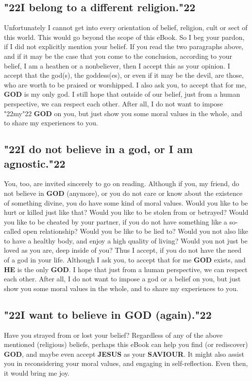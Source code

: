 \documentclass[10pt,a5paper]{article}
\newcommand{\God}[0]{\textbf{GOD}}
\newcommand{\He}[0]{\textbf{HE}}
\newcommand{\Jesus}[0]{\textbf{JESUS}}
\newcommand{\Saviour}[0]{\textbf{SAVIOUR}}
\newcommand{\q}[1]{\char"22{#1}\char"22 }
\begin{document}
	\subsection{\q{I belong to a different religion.}}
		Unfortunately I cannot get into every orientation of belief,
		religion, cult or sect of this world.
		This would go beyond the scope of this eBook.
		So I beg your pardon,
		if I did not explicitly mention your belief.
		If you read the two paragraphs above,
		and if it may be the case that you come to the conclusion,
		according to your belief,
		I am a heathen or a nonbeliever,
		then I accept this as your opinion.
		I accept that the god(s),
		the goddess(es),
		or even if it may be the devil,
		are those,
		who are worth to be praised or worshipped.
		I also ask you,
		to accept that for me,
		{\God} is my only god.
		I still hope that outside of our belief,
		just from a human perspective,
		we can respect each other.
		After all,
		I do not want to impose \q{my} {\God} on you,
		but just show you some moral values in the whole,
		and to share my experiences to you.
		
	\subsection{\q{I do not believe in a god, or I am agnostic.}}
		You,
		too,
		are invited sincerely to go on reading.
		Although if you,
		my friend,
		do not believe in {\God} (anymore),
		or you do not care or know about the existence of something divine,
		you do have some kind of moral values.
		Would you like to be hurt or killed just like that?
		Would you like to be stolen from or betrayed?
		Would you like to be cheated by your partner,
		if you do not have something like a so-called open relationship?
		Would you be like to be lied to?
		Would you not also like to have a healthy body,
		and enjoy a high quality of living?
		Would you not just be loved as you are,
		deep inside of you?
		Thus I accept,
		if you do not have the need of a god in your life.
		Although I ask you,
		to accept that for me {\God} exists,
		and {\He} is the only {\God}.
		I hope that just from a human perspective,
		we can respect each other.
		After all,
		I do not want to impose a god or a belief on you,
		but just show you some moral values in the whole,
		and to share my experiences to you.
		
	\subsection{\q{I want to believe in {\God} (again).}}
		Have you strayed from or lost your belief?
		Regardless of any of the above mentioned (religious) beliefs,
		perhaps this eBook can help you find (or rediscover) {\God},
		and maybe even accept {\Jesus} as your {\Saviour}.
		It might also assist you in reconsidering your moral values,
		and engaging in self-reflection.
		Even then,
		it would bring me joy.
\end{document}
